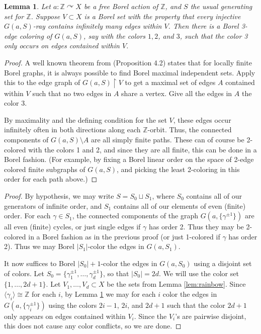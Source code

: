 \documentclass[10pt,a4paper]{article}
\newcommand{\0}{\varnothing}
\newcommand{\Z}{\mathbb{Z}}
\newcommand{\res}{\upharpoonright}
\newtheorem{lemma}{Lemma}
\begin{document}
\begin{lemma}\label{lem:Z}
Let $a:\Z \curvearrowright X$ be a free Borel action of $\Z$, and $S$ the usual generating set for $\Z$. Suppose $V \subset X$ is a Borel set with the property that every injective $G(a,S)$-ray contains infinitely many edges within $V$. Then there is a Borel 3-edge coloring of $G(a,S)$, say with the colors $1,2$, and $3$, such that the color 3 only occurs on edges contained within $V$.
\end{lemma}

\begin{proof}
A well known theorem from \cite{KST} (Proposition 4.2) states that for locally finite Borel graphs, it is always possible to find Borel maximal independent sets. Apply this to the edge graph of $G(a,S) \res V$ to get a maximal set of edges $A$ contained within $V$ such that no two edges in $A$ share a vertex. Give all the edges in $A$ the color 3.

By maximality and the defining condition for the set $V$, these edges occur infinitely often in both directions along each $\Z$-orbit. Thus, the connected components of $G(a,S) \setminus A$ are all simply finite paths. These can of course be 2-colored with the colors 1 and 2, and since they are all finite, this can be done in a Borel fashion. (For example, by fixing a Borel linear order on the space of 2-edge colored finite subgraphs of $G(a,S)$, and picking the least 2-coloring in this order for each path above.)
\end{proof}

\begin{proof}
By hypothesis, we may write $S = S_0 \sqcup S_1$, where $S_0$ contains all of our generators of infinite order, and $S_1$ contains all of our elements of even (finite) order. For each $\gamma \in S_1$, the connected components of the graph $G(a,\{\gamma^{\pm 1} \})$ are all even (finite) cycles, or just single edges if $\gamma$ has order 2. Thus they may be 2-colored in a Borel fashion as in the previous proof (or just 1-colored if $\gamma$ has order 2). Thus we may Borel $|S_1|$-color the edges in $G(a,S_1)$.

It now suffices to Borel $|S_0|+1$-color the edges in $G(a,S_0)$ using a disjoint set of colors. Let $S_0 = \{\gamma_1^{\pm 1},\ldots,\gamma_d^{\pm 1}\}$, so that $|S_0| = 2d$. We will use the color set $\{1,\ldots,2d+1\}$. Let $V_1,\ldots,V_d \subset X$ be the sets from Lemma \ref{lem:rainbow}. Since $\langle \gamma_i \rangle \cong \Z$ for each $i$, by Lemma \ref{lem:Z} we may for each $i$ color the edges in $G(a,\{ \gamma_i^{\pm 1} \})$ using the colors $2i-1$, $2i$, and $2d+1$ such that the color $2d+1$ only appears on edges contained within $V_i$. Since the $V_i$'s are pairwise disjoint, this does not cause any color conflicts, so we are done.
\end{proof}
\end{document}
